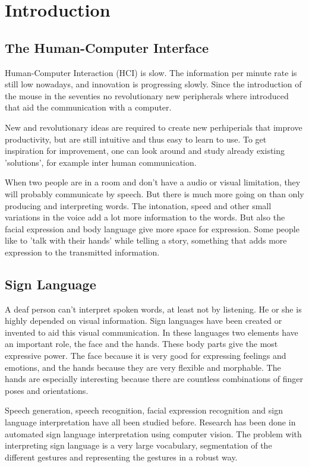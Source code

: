 
\chapter{Introduction}
\label{ch:intro}

\section{The Human-Computer Interface}


Human-Computer Interaction  (HCI) is slow. The information per minute rate is still low nowadays, and innovation is progressing slowly. Since the introduction of the mouse in the seventies no revolutionary new peripherals where introduced that aid the communication with a computer. 

New and revolutionary ideas are required to create new perhiperials that improve productivity, but are still intuitive and thus easy to learn to use. To get inspiration for improvement, one can look around and study already existing 'solutions', for example inter human communication. 

When two people are in a room and don't have a audio or visual limitation, they will probably communicate by speech. But there is much more going on than only producing and interpreting words. The intonation, speed and other small variations in the voice add a lot more information to the words. But also the facial expression and body language give more space for expression. Some people like to 'talk with their hands' while telling a story, something that adds more expression to the transmitted information.


\section{Sign Language}

A deaf person can't interpret spoken words, at least not by listening. He or she is highly depended on visual information. Sign languages have been created or invented to aid this visual communication. In these languages two elements have an important role, the face and the hands. These body parts give the most expressive power. The face because it is very good for expressing feelings and emotions, and the hands because they are very flexible and morphable. The hands are especially interesting because there are countless combinations of finger poses and orientations. 

Speech generation, speech recognition, facial expression recognition and sign language interpretation have all been studied before. Research has been done in automated sign language interpretation using computer vision\cite{Buehler2009}\cite{RichardBowden2004}. The problem with interpreting sign language is a very large vocabulary, segmentation of the different gestures and representing the gestures in a robust way.

